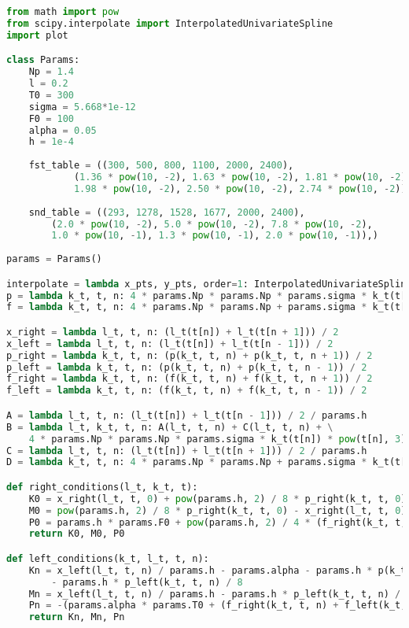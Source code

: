 \begin{lstlisting}[language=python]
from math import pow
from scipy.interpolate import InterpolatedUnivariateSpline
import plot

class Params:
    Np = 1.4
    l = 0.2
    T0 = 300
    sigma = 5.668*1e-12
    F0 = 100
    alpha = 0.05
    h = 1e-4
 
    fst_table = ((300, 500, 800, 1100, 2000, 2400), 
            (1.36 * pow(10, -2), 1.63 * pow(10, -2), 1.81 * pow(10, -2),
            1.98 * pow(10, -2), 2.50 * pow(10, -2), 2.74 * pow(10, -2)))
 
    snd_table = ((293, 1278, 1528, 1677, 2000, 2400),
        (2.0 * pow(10, -2), 5.0 * pow(10, -2), 7.8 * pow(10, -2),
        1.0 * pow(10, -1), 1.3 * pow(10, -1), 2.0 * pow(10, -1)),)
 
params = Params()

interpolate = lambda x_pts, y_pts, order=1: InterpolatedUnivariateSpline(x_pts, y_pts, k=order)
p = lambda k_t, t, n: 4 * params.Np * params.Np * params.sigma * k_t(t[n]) * pow(t[n], 3)
f = lambda k_t, t, n: 4 * params.Np * params.Np + params.sigma * k_t(t[n]) * pow(params.T0, 4)

x_right = lambda l_t, t, n: (l_t(t[n]) + l_t(t[n + 1])) / 2
x_left = lambda l_t, t, n: (l_t(t[n]) + l_t(t[n - 1])) / 2
p_right = lambda k_t, t, n: (p(k_t, t, n) + p(k_t, t, n + 1)) / 2
p_left = lambda k_t, t, n: (p(k_t, t, n) + p(k_t, t, n - 1)) / 2
f_right = lambda k_t, t, n: (f(k_t, t, n) + f(k_t, t, n + 1)) / 2
f_left = lambda k_t, t, n: (f(k_t, t, n) + f(k_t, t, n - 1)) / 2

A = lambda l_t, t, n: (l_t(t[n]) + l_t(t[n - 1])) / 2 / params.h
B = lambda l_t, k_t, t, n: A(l_t, t, n) + C(l_t, t, n) + \
    4 * params.Np * params.Np * params.sigma * k_t(t[n]) * pow(t[n], 3) * params.h
C = lambda l_t, t, n: (l_t(t[n]) + l_t(t[n + 1])) / 2 / params.h
D = lambda k_t, t, n: 4 * params.Np * params.Np + params.sigma * k_t(t[n]) * pow(params.T0, 4) * params.h

def right_conditions(l_t, k_t, t):
    K0 = x_right(l_t, t, 0) + pow(params.h, 2) / 8 * p_right(k_t, t, 0) + pow(params.h, 2) / 4 * p(k_t, t, 0)
    M0 = pow(params.h, 2) / 8 * p_right(k_t, t, 0) - x_right(l_t, t, 0)
    P0 = params.h * params.F0 + pow(params.h, 2) / 4 * (f_right(k_t, t, 0) + f_left(k_t, t, 0))
    return K0, M0, P0

def left_conditions(k_t, l_t, t, n):
    Kn = x_left(l_t, t, n) / params.h - params.alpha - params.h * p(k_t, t, n) / 4 \
        - params.h * p_left(k_t, t, n) / 8
    Mn = x_left(l_t, t, n) / params.h - params.h * p_left(k_t, t, n) / 8
    Pn = -(params.alpha * params.T0 + (f_right(k_t, t, n) + f_left(k_t, t, n)) / 4 * params.h)
    return Kn, Mn, Pn


\end{lstlisting}

